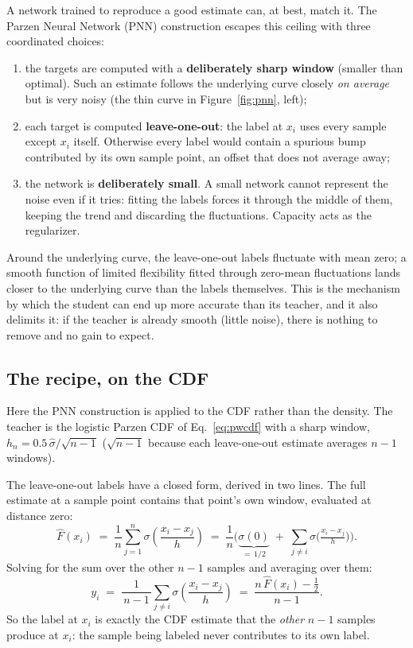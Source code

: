 \documentclass[11pt]{article}
\newcommand{\Fhat}{\widehat{F}}
\newcommand{\shat}{\hat{\sigma}}
\begin{document}
A network trained to reproduce a good estimate can, at best, match it. The Parzen Neural
Network (PNN) construction \cite{trentin2018} escapes this ceiling with three coordinated
choices:

\begin{enumerate}
  \item the targets are computed with a \textbf{deliberately sharp window} (smaller than
        optimal). Such an estimate follows the underlying curve closely \emph{on average}
        but is very noisy (the thin curve in Figure~\ref{fig:pnn}, left);
  \item each target is computed \textbf{leave-one-out}: the label at $x_i$ uses every
        sample except $x_i$ itself. Otherwise every label would contain a spurious bump
        contributed by its own sample point, an offset that does not average away;
  \item the network is \textbf{deliberately small}. A small network cannot represent the
        noise even if it tries: fitting the labels forces it through the middle of them,
        keeping the trend and discarding the fluctuations. Capacity acts as the
        regularizer.
\end{enumerate}

Around the underlying curve, the leave-one-out labels fluctuate with mean zero; a smooth
function of limited flexibility fitted through zero-mean fluctuations lands closer to the
underlying curve than the labels themselves. This is the mechanism by which the student can
end up more accurate than its teacher, and it also delimits it: if the teacher is already
smooth (little noise), there is nothing to remove and no gain to expect.

\subsection{The recipe, on the CDF}
\label{sec:recipe}

Here the PNN construction is applied to the CDF rather than the density. The teacher is the
logistic Parzen CDF of Eq.~\eqref{eq:pwcdf} with a sharp window,
$h_n = 0.5\,\shat/\sqrt{n-1}$ ($\sqrt{n-1}$ because each leave-one-out estimate averages
$n-1$ windows).

The leave-one-out labels have a closed form, derived in two lines. The full estimate at a
sample point contains that point's own window, evaluated at distance zero:
\begin{equation}
  \Fhat(x_i) \;=\; \frac{1}{n}\sum_{j=1}^{n} \sigma\!\left(\frac{x_i - x_j}{h}\right)
  \;=\; \frac{1}{n}\Big(\underbrace{\sigma(0)}_{=\,1/2}
        \;+\; \sum_{j \neq i} \sigma\!\big(\tfrac{x_i - x_j}{h}\big)\Big).
\end{equation}
Solving for the sum over the other $n-1$ samples and averaging over them:
\begin{equation}
  y_i \;=\; \frac{1}{\,n-1\,}\sum_{j \neq i} \sigma\!\left(\frac{x_i - x_j}{h}\right)
      \;=\; \frac{n\,\Fhat(x_i) - \tfrac12}{\,n-1\,}.
  \label{eq:loo}
\end{equation}
So the label at $x_i$ is exactly the CDF estimate that the \emph{other} $n-1$ samples
produce at $x_i$: the sample being labeled never contributes to its own label.
\end{document}
